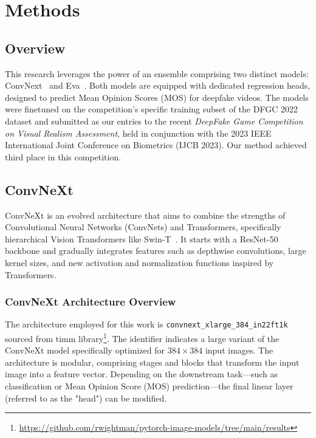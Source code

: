 \documentclass[a4paper,12pt,openright]{book}
\begin{document}
\chapter{Methods}
\label{chap:methods}

\section{Overview}

This research leverages the power of an ensemble comprising two distinct models:
ConvNext~\cite{DBLP:journals/corr/abs-2201-03545} and Eva~\cite{fang2022eva}. Both models are equipped with dedicated regression heads, designed to predict Mean Opinion Scores (MOS) for deepfake videos. The models were finetuned on the competition's specific training subset of the DFGC 2022 dataset and submitted as our entries to the recent \textit{DeepFake Game Competition on Visual Realism Assessment}, held in conjunction with the 2023 IEEE International Joint Conference on Biometrics (IJCB 2023). Our method achieved third place in this competition.

\section{ConvNeXt}
\label{sec:convnext}

ConvNeXt is an evolved architecture that aims to combine the strengths of Convolutional Neural Networks (ConvNets) and Transformers, specifically hierarchical Vision Transformers like Swin-T~\cite{DBLP:journals/corr/abs-2103-14030}. It starts with a ResNet-50~\cite{DBLP:journals/corr/HeZRS15} backbone and gradually integrates features such as depthwise convolutions, large kernel sizes, and new activation and normalization functions inspired by Transformers.

\subsection{ConvNeXt Architecture Overview}
The architecture employed for this work is \texttt{convnext\_xlarge\_384\_in22ft1k} sourced from timm library\footnote{\label{timm}\url{https://github.com/rwightman/pytorch-image-models/tree/main/results}}. The identifier indicates a large variant of the ConvNeXt model specifically optimized for \(384 \times 384\) input images. The architecture is modular, comprising stages and blocks that transform the input image into a feature vector. Depending on the downstream task—such as classification or Mean Opinion Score (MOS) prediction—the final linear layer (referred to as the "head") can be modified.
\end{document}
